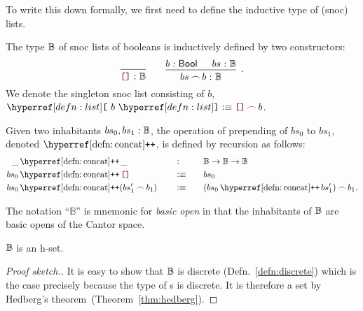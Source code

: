 To write this down formally, we first need to define the inductive type of (snoc) lists.

\begin{defn}\label{defn:list}
  The type $\mathbb{B}{}$ of snoc lists of booleans is inductively defined by two
  constructors:
  \[
    \begin{prooftree}
      \hypo{\phantom{\bitlist}}
      \infer1{\oftyI{\emptylist{}}{\bitlist{}}}
    \end{prooftree}
    \qquad
    \begin{prooftree}
      \hypo{\oftyI{b}{\bool{}}}
      \hypo{\oftyI{bs}{\bitlist{}}}
      \infer2[.]{\oftyI{\snoc{bs}{b}}{\bitlist{}}}
    \end{prooftree}
  \]
  We denote the singleton snoc list consisting of $b$,
  $\singleton{b} \is \snoc{\emptylist}{b}$.
\end{defn}

\begin{defn}\label{defn:concat}
  Given two inhabitants $bs_0, bs_1:\mathbb{B}{}$, the operation of prepending of
  $bs_0$ to $bs_1$, denoted $\concat$, is defined by recursion as follows:
  \begin{alignat*}{3}
    \_&\concat\_                      \quad&&:\quad   && \bitlist{} \rightarrow \bitlist{} \rightarrow \bitlist{} \\
    bs_0 &\concat \emptylist          \quad&&\is\quad && bs_0                                 \\
    bs_0 &\concat (\snoc{bs_1'}{b_1}) \quad&&\is\quad && \snoc{(bs_0 \concat bs_1')}{b_1}     .
  \end{alignat*}
\end{defn}

The notation ``$\mathbb{B}$'' is mnemonic for \emph{basic open} in that the inhabitants
of $\mathbb{B}{}$ are basic opens of the Cantor space.

\begin{prop}\label{prop:list-set}
  $\mathbb{B}{}$ is an h-set.
\end{prop}
\begin{proof}[Proof sketch.]
  It is easy to show that $\mathbb{B}{}$ is discrete (Defn.~\ref{defn:discrete}) which is
  the case precisely because the type of \verbool{}s is discrete. It is therefore a set by
  Hedberg's theorem~(Theorem~\ref{thm:hedberg}).
\end{proof}

